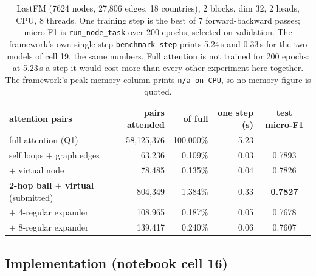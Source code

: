 \begin{table}[H]
\centering
\caption{LastFM (7624 nodes, 27{,}806 edges, 18 countries), 2 blocks, dim 32, 2 heads, CPU, 8 threads. One training step is the best of 7 forward-backward passes; micro-F1 is \texttt{run\_node\_task} over 200 epochs, selected on validation. The framework's own single-step \texttt{benchmark\_step} prints 5.24\,s and 0.33\,s for the two models of cell 19, the same numbers. Full attention is not trained for 200 epochs: at 5.23\,s a step it would cost more than every other experiment here together. The framework's peak-memory column prints \texttt{n/a on CPU}, so no memory figure is quoted.}
\label{p1:tab:q2lastfm}
\small
\begin{tabular}{lrrrc}
\toprule
attention pairs & pairs attended & of full & one step (s) & test micro-F1 \\
\midrule
full attention (Q1) & 58{,}125{,}376 & 100.000\% & 5.23 & --- \\
self loops $+$ graph edges & 63{,}236 & 0.109\% & 0.03 & 0.7893 \\
$+$ virtual node & 78{,}485 & 0.135\% & 0.04 & 0.7826 \\
\textbf{2-hop ball $+$ virtual} (submitted) & 804{,}349 & 1.384\% & 0.33 & \textbf{0.7827} \\
$+$ 4-regular expander & 108{,}965 & 0.187\% & 0.05 & 0.7678 \\
$+$ 8-regular expander & 139{,}417 & 0.240\% & 0.06 & 0.7607 \\
\bottomrule
\end{tabular}
\end{table}

\subsection*{Implementation (notebook cell 16)}

